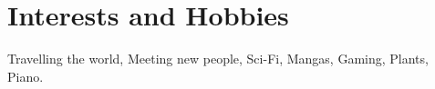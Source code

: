 \documentclass[11pt,a4paper,roman]{moderncv}        %
\begin{document}
\section{Interests and Hobbies}
\vspace{-5px}
Travelling the world, Meeting new people, Sci-Fi, Mangas, Gaming, Plants, Piano.
%
\end{document}
